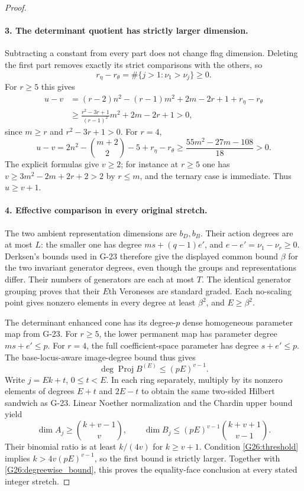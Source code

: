 \begin{proof}
\paragraph{3. The determinant quotient has strictly larger dimension.}
Subtracting a constant from every part does not change flag
dimension. Deleting the first part removes exactly its strict
comparisons with the others, so
\[
 r_\eta-r_\theta
       =\#\{j>1:\nu_1>\nu_j\}\ge0.
\]
For $r\ge5$ this gives
\[
 \begin{aligned}
 u-v&=(r-2)n^2-(r-1)m^2+2m-2r+1+r_\eta-r_\theta\\
 &\ge\frac{r^2-3r+1}{(r-1)^2}m^2+2m-2r+1>0,
 \end{aligned}
\]
since $m\ge r$ and $r^2-3r+1>0$. For $r=4$,
\[
 u-v=2n^2-\binom{m+2}{2}-5+r_\eta-r_\theta
       \ge\frac{55m^2-27m-108}{18}>0.
\]
The explicit formulas give $v\ge2$; for instance at $r\ge5$
one has $v\ge3m^2-2m+2r+2>2$ by $r\le m$, and the ternary
case is immediate. Thus $u\ge v+1$.

\paragraph{4. Effective comparison in every original stretch.}
The two ambient representation dimensions are $b_D,b_B$.
Their action degrees are at most $L$: the smaller one has
degree $ms+(q-1)e'$, and
$e-e'=\nu_1-\nu_r\ge0$. Derksen's bounds used in G-23
therefore give the displayed common bound $\beta$ for the
two invariant generator degrees, even though the groups and
representations differ. Their numbers of generators are each
at most $T$. The identical generator grouping proves that
their $E$th Veroneses are standard graded. Each no-scaling
point gives nonzero elements in every degree at least
$\beta^2$, and $E\ge\beta^2$.

The determinant enhanced cone has its degree-$p$ dense
homogeneous parameter map from G-23. For $r\ge5$, the lower
permanent map has parameter degree $ms+e'\le p$. For $r=4$,
the full coefficient-space parameter has degree $s+e'\le p$.
The base-locus-aware image-degree bound thus gives
\[
                  \deg\operatorname{Proj} B^{(E)}\le(pE)^{v-1}.
\]
Write $j=Ek+t$, $0\le t<E$. In each ring separately, multiply
by its nonzero elements of degrees $E+t$ and $2E-t$ to obtain
the same two-sided Hilbert sandwich as G-23. Linear Noether
normalization and the Chardin upper bound yield
\[
 \dim A_j\ge\binom{k+v-1}{v},\qquad
 \dim B_j\le(pE)^{v-1}\binom{k+v+1}{v-1}.
\]
Their binomial ratio is at least $k/(4v)$ for $k\ge v+1$.
Condition \eqref{G26:threshold} implies
$k>4v(pE)^{v-1}$, so the first bound is strictly larger.
Together with \eqref{G26:degreewise_bound}, this proves the
equality-face conclusion at every stated integer stretch.


\end{proof}
